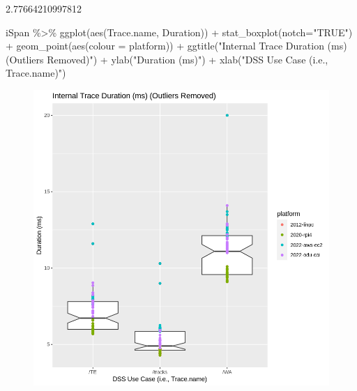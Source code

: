 \documentclass[
  letterpaper,
  DIV=11,
  numbers=noendperiod]{scrartcl}
\newenvironment{Shaded}{\begin{snugshade}}{\end{snugshade}}
\newcommand{\AttributeTok}[1]{\textcolor[rgb]{0.40,0.45,0.13}{#1}}
\newcommand{\FunctionTok}[1]{\textcolor[rgb]{0.28,0.35,0.67}{#1}}
\newcommand{\NormalTok}[1]{\textcolor[rgb]{0.00,0.23,0.31}{#1}}
\newcommand{\SpecialCharTok}[1]{\textcolor[rgb]{0.37,0.37,0.37}{#1}}
\newcommand{\StringTok}[1]{\textcolor[rgb]{0.13,0.47,0.30}{#1}}
\begin{document}
2.77664210997812

\begin{Shaded}
\begin{Highlighting}[]
\NormalTok{iSpan }\SpecialCharTok{\%\textgreater{}\%}
    \FunctionTok{ggplot}\NormalTok{(}\FunctionTok{aes}\NormalTok{(Trace.name, Duration)) }\SpecialCharTok{+} 
    \FunctionTok{stat\_boxplot}\NormalTok{(}\AttributeTok{notch=}\StringTok{"TRUE"}\NormalTok{) }\SpecialCharTok{+} \FunctionTok{geom\_point}\NormalTok{(}\FunctionTok{aes}\NormalTok{(}\AttributeTok{colour =}\NormalTok{ platform)) }\SpecialCharTok{+}
    \FunctionTok{ggtitle}\NormalTok{(}\StringTok{"Internal Trace Duration (ms) (Outliers Removed)"}\NormalTok{) }\SpecialCharTok{+}
    \FunctionTok{ylab}\NormalTok{(}\StringTok{"Duration (ms)"}\NormalTok{) }\SpecialCharTok{+}
    \FunctionTok{xlab}\NormalTok{(}\StringTok{"DSS Use Case (i.e., Trace.name)"}\NormalTok{)}
\end{Highlighting}
\end{Shaded}

\begin{figure}[H]

{\centering \includegraphics{dss-span-analysis-rev5_files/figure-pdf/cell-55-output-1.png}

}

\end{figure}
\end{document}
